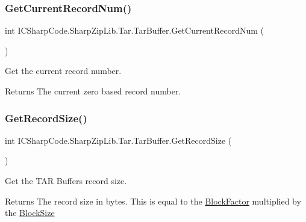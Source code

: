 \subsubsection{\texorpdfstring{Get\+Current\+Record\+Num()}{GetCurrentRecordNum()}}
{\footnotesize\ttfamily int I\+C\+Sharp\+Code.\+Sharp\+Zip\+Lib.\+Tar.\+Tar\+Buffer.\+Get\+Current\+Record\+Num (\begin{DoxyParamCaption}{ }\end{DoxyParamCaption})\hspace{0.3cm}{\ttfamily [inline]}}



Get the current record number. 

\begin{DoxyReturn}{Returns}
The current zero based record number. 
\end{DoxyReturn}
\mbox{\label{class_i_c_sharp_code_1_1_sharp_zip_lib_1_1_tar_1_1_tar_buffer_a9c0ea4d0e06ee2b30734790969900ab6}} 
\subsubsection{\texorpdfstring{Get\+Record\+Size()}{GetRecordSize()}}
{\footnotesize\ttfamily int I\+C\+Sharp\+Code.\+Sharp\+Zip\+Lib.\+Tar.\+Tar\+Buffer.\+Get\+Record\+Size (\begin{DoxyParamCaption}{ }\end{DoxyParamCaption})\hspace{0.3cm}{\ttfamily [inline]}}



Get the T\+AR Buffer\textquotesingle{}s record size. 

\begin{DoxyReturn}{Returns}
The record size in bytes. This is equal to the \hyperlink{class_i_c_sharp_code_1_1_sharp_zip_lib_1_1_tar_1_1_tar_buffer_add6a353dfa4c8321ccd5a5e54b7d5958}{Block\+Factor} multiplied by the \hyperlink{class_i_c_sharp_code_1_1_sharp_zip_lib_1_1_tar_1_1_tar_buffer_a99cabe6ecd1046ab392bd6ed33bda07a}{Block\+Size}
\end{DoxyReturn}
\mbox{\label{class_i_c_sharp_code_1_1_sharp_zip_lib_1_1_tar_1_1_tar_buffer_a8cb2692cc566b69ded079be6881b09fe}} 
